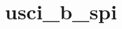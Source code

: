 \hypertarget{group__usci__b__spi__api}{}\section{usci\+\_\+b\+\_\+spi}
\label{group__usci__b__spi__api}
